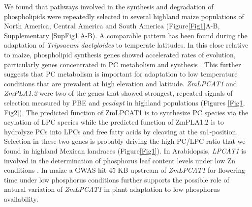 \documentclass[9pt,twocolumn,twoside,lineno]{BioRxiv}
\begin{document}
We found that pathways involved in the synthesis and degradation of phospholipids were repeatedly selected in several highland maize populations of North America, Central America and South America (Figure\ref{Fig1}A-B, Supplementary \ref{SupFig1}A-B). 
A comparable pattern has been found during the adaptation of \textit{Tripsacum dactyloides} to temperate latitudes. 
In this close relative to maize, phospholipid synthesis genes showed accelerated rates of evolution, particularly genes concentrated in PC metabolism and synthesis \cite{Yan2019-tx}.
This further suggests that PC metabolism is important for adaptation to low temperature conditions that are prevalent at high elevation and latitude. 
\textit{ZmLPCAT1} and \textit{ZmPLA1.2} were two of the genes that showed strongest, repeated signals of selection measured by PBE and \textit{pcadapt} in highland populations (Figures \ref{Fig1, Fig2}). 
The predicted function of ZmLPCAT1 is to synthesize PC species via the acylation of LPC species while the predicted function of ZmPLA1.2 is to hydrolyze PCs into LPCs and free fatty acids by cleaving at the sn1-position.
Selection in these two genes is probably driving the high PC/LPC ratio that we found in highland Mexican landraces (Figure\ref{Fig1}).
In Arabidopsis, \textit{LPCAT1} is involved in the determination of phosphorus leaf content levels under low Zn conditions \cite{Kisko2018-zm}.
In maize a GWAS hit 45 KB upstream of \textit{ZmLPCAT1} for flowering time under low phosphorus conditions further supports the possible role of natural variation of \textit{ZmLPCAT1} in plant adaptation to low phosphorus availability. 
\end{document}
